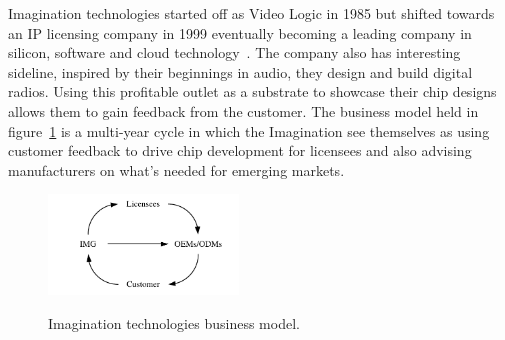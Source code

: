 
Imagination technologies started off as Video Logic in 1985 but shifted towards an IP licensing company in 1999 eventually becoming a leading company in silicon, software and cloud technology~\cite{ImgHist}.
The company also has interesting sideline, inspired by their beginnings in audio, they design and build digital radios.
Using this profitable outlet as a substrate to showcase their chip designs allows them to gain feedback from the customer.
The business model held in figure~\ref{figure:ImgModel} is a multi-year cycle in which the Imagination see themselves as using customer feedback to drive chip development for licensees and also advising manufacturers on what's needed for emerging markets. 


\begin{figure}[htb]
   \centering
   \includegraphics[width = 0.45\textwidth]{figures/ImgModel.pdf}
   \label{figure:ImgModel}
   \caption{Imagination technologies business model.}
\end{figure}
